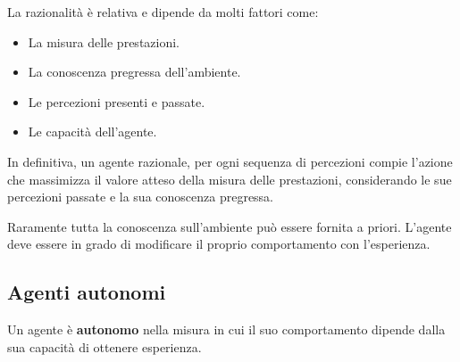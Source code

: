 La razionalit\`a \`e relativa e dipende da molti fattori come:
\begin{itemize}
	\item La misura delle prestazioni.
	\item La conoscenza pregressa dell'ambiente.
	\item Le percezioni presenti e passate.
	\item Le capacit\`a dell'agente.
\end{itemize}
In definitiva, un agente razionale, per ogni sequenza di percezioni compie l'azione che
massimizza il valore atteso della misura delle prestazioni, considerando le sue percezioni
passate e la sua conoscenza pregressa.

Raramente tutta la conoscenza sull'ambiente pu\`o essere fornita a priori. L'agente deve
essere in grado di modificare il proprio comportamento con l'esperienza.
\subsection{Agenti autonomi}
Un agente \`e \textbf{autonomo} nella misura in cui il suo comportamento dipende dalla sua
capacit\`a di ottenere esperienza.

